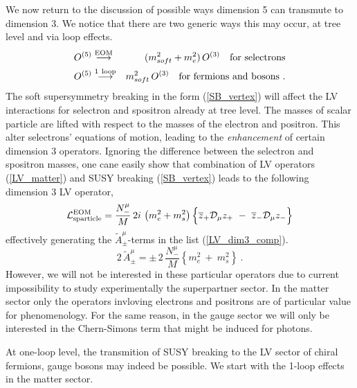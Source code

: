 \documentclass[paper,12pt]{revtex4}
\begin{document}
	We now return to the discussion of possible ways dimension 5 
can transmute to dimension 3. We notice that there are two generic ways this 
may occur, at tree level and via loop effects.
\begin{eqnarray*}
\nonumber
	O^{(5)} & \stackrel{\mathrm {EOM}}{\longrightarrow} &
			  (m_{soft}^2 + m_e^2)\, O^{(3)}~~~{\rm for~selectrons}\\
\nonumber
	O^{(5)} & \stackrel{\mathrm {1\ loop}}{\longrightarrow} &
			  m_{soft}^2\, O^{(3)} ~~~{\rm for~fermions ~and ~bosons}
~.
\end{eqnarray*}
The soft supersymmetry
	breaking in the form (\ref{SB_vertex}) will affect the
	LV interactions for selectron and spositron already at tree level.
The  masses of scalar particle are lifted with
	respect to the masses of the electron and positron. 
	This alter selectrons' equations of motion, leading to the 
	{\em enhancement} of certain dimension 3 operators.	Ignoring 
the difference between the selectron and spositron
	masses, one cane easily show that combination of LV operators (\ref{LV_matter}) and 
	SUSY breaking (\ref{SB_vertex}) leads to the following dimension 3 LV operator,
\begin{equation}
	  \mathcal{L}_{\rm sparticle}^{\rm EOM} = 
	\frac{N_-^\mu}{M}\, 2 i\, 
	\left(
		m_e^2 + m_s^2
	\right)
	\Bigl\{ 
		\overline{z}_+ \mathcal{D}_\mu z_+ 
		~-~
		\overline{z}_- \mathcal{D}_\mu z_- 
	\Bigr\}
\end{equation}
effectively  generating the $ \widetilde{A}^\mu_\pm $-terms in 
	the list (\ref{LV_dim3_comp}). 
\begin{equation}
	2\, \widetilde{A}_\pm^\mu = 
	\pm\, 2\, \frac{N_-^\mu}
                        { M }   
	\left\{
		m_e^2 ~+~ m_s^2
	\right\}~.
\end{equation}
However, we will not be interested in these particular operators 
	due to current impossibility to study experimentally  the superpartner sector. 
	In the matter sector only the operators invloving electrons and positrons are 
     of particular value for phenomenology.  
For the same reason, in the gauge sector we will only be interested
	in the Chern-Simons term that might be induced for photons.
	
At one-loop level, the transmition 
	of SUSY breaking to the LV sector of chiral fermions, gauge bosons may indeed
	be possible. We start with the 1-loop effects in the matter sector.
\end{document}
